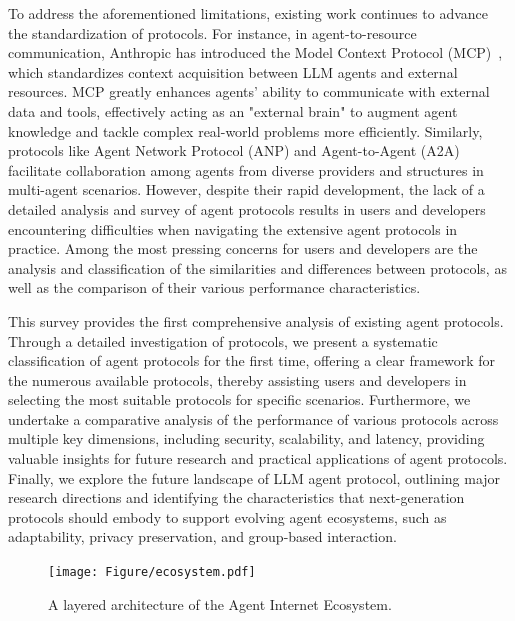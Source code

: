 \documentclass[10pt,preprint]{article}
\begin{document}
To address the aforementioned limitations, existing work continues to advance the standardization of protocols. For instance, in agent-to-resource communication, Anthropic has introduced the Model Context Protocol (MCP)~\citep{anthropic2025}, which standardizes context acquisition between LLM agents and external resources. MCP greatly enhances agents' ability to communicate with external data and tools, effectively acting as an "external brain" to augment agent knowledge and tackle complex real-world problems more efficiently. Similarly, protocols like Agent Network Protocol (ANP) \citep{anp2024} and Agent-to-Agent (A2A) \citep{a2a2025} facilitate collaboration among agents from diverse providers and structures in multi-agent scenarios. However, despite their rapid development, the lack of a detailed analysis and survey of agent protocols results in users and developers encountering difficulties when navigating the extensive agent protocols in practice. Among the most pressing concerns for users and developers are the analysis and classification of the similarities and differences between protocols, as well as the comparison of their various performance characteristics.

This survey provides the first comprehensive analysis of existing agent protocols. Through a detailed investigation of protocols, we present a systematic classification of agent protocols for the first time, offering a clear framework for the numerous available protocols, thereby assisting users and developers in selecting the most suitable protocols for specific scenarios. Furthermore, we undertake a comparative analysis of the performance of various protocols across multiple key dimensions, including security, scalability, and latency, providing valuable insights for future research and practical applications of agent protocols. 
Finally, we explore the future landscape of LLM agent protocol, outlining major research directions and identifying the characteristics that next-generation protocols should embody to support evolving agent ecosystems, such as adaptability, privacy preservation, and group-based interaction.

\begin{figure}[t]
    \centering
    \texttt{[image: Figure/ecosystem.pdf]}
    \caption{A layered architecture of the Agent Internet Ecosystem.}
    \label{fig:ecosystem}
\end{figure}
\end{document}
